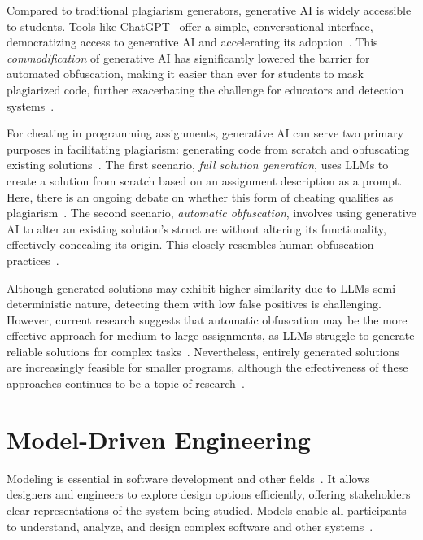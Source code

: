 Compared to traditional plagiarism generators, generative AI is widely accessible to students. Tools like ChatGPT~\cite{ChatGPT} offer a simple, conversational interface, democratizing access to generative AI and accelerating its adoption~\cite{Saglam2024a}. This \textit{commodification} of generative AI has significantly lowered the barrier for automated obfuscation, making it easier than ever for students to mask plagiarized code, further exacerbating the challenge for educators and detection systems~\cite{ChatGPTGuide}.

For cheating in programming assignments, generative AI can serve two primary purposes in facilitating plagiarism: generating code from scratch and obfuscating existing solutions~\cite{Saglam2024a, Saglam2024b}.
%
The first scenario, \textit{full solution generation}, uses \acp{LLM} to create a solution from scratch based on an assignment description as a prompt. Here, there is an ongoing debate on whether this form of cheating qualifies as plagiarism~\cite{Novak2019, Saglam2024a}.
%
The second scenario, \textit{automatic obfuscation}, involves using generative AI to alter an existing solution's structure without altering its functionality, effectively concealing its origin. This closely resembles human obfuscation practices~\cite{Novak2019}.

Although generated solutions may exhibit higher similarity due to \acp{LLM} semi-deterministic nature, detecting them with low false positives is challenging.
However, current research suggests that automatic obfuscation may be the more effective approach for medium to large assignments, as \acp{LLM} struggle to generate reliable solutions for complex tasks~\cite{Choudhuri2024, Saglam2024b}.
Nevertheless, entirely generated solutions are increasingly feasible for smaller programs, although the effectiveness of these approaches continues to be a topic of research~\cite{Qadir2023}.

\section{Model-Driven Engineering}

Modeling is essential in software development and other fields~\cite{Stahl2006}. It allows designers and engineers to explore design options efficiently, offering stakeholders clear representations of the system being studied. Models enable all participants to understand, analyze, and design complex software and other systems~\cite{Kienzle2024}.

